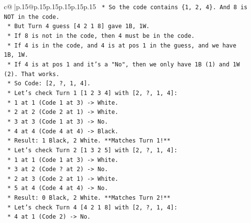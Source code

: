 \documentclass{article}
\begin{document}
{\begin{supertabular}{c@{$\;$}|p{.15\linewidth}@{}p{.15\linewidth}p{.15\linewidth}p{.15\linewidth}p{.15\linewidth}p{.15\linewidth}}
{{{\texttt{                                *   So the code contains \{1, 2, 4\}. And 8 is NOT in the code.} \\
\texttt{                                *   But Turn 4 guess {[}4 2 1 8{]} gave 1B, 1W.} \\
\texttt{                                *   If 8 is not in the code, then 4 must be in the code.} \\
\texttt{                                *   If 4 is in the code, and 4 is at pos 1 in the guess, and we have 1B, 1W.} \\
\texttt{                                *   If 4 is at pos 1 and it's a "No", then we only have 1B (1) and 1W (2). That works.} \\
\texttt{                                *   So Code: {[}2, ?, 1, 4{]}.} \\
\texttt{                                *   Let's check Turn 1 {[}1 2 3 4{]} with {[}2, ?, 1, 4{]}:} \\
\texttt{                                    *   1 at 1 (Code 1 at 3) {-}> White.} \\
\texttt{                                    *   2 at 2 (Code 2 at 1) {-}> White.} \\
\texttt{                                    *   3 at 3 (Code 1 at 3) {-}> No.} \\
\texttt{                                    *   4 at 4 (Code 4 at 4) {-}> Black.} \\
\texttt{                                    *   Result: 1 Black, 2 White. **Matches Turn 1!**} \\
\texttt{                                *   Let's check Turn 2 {[}1 3 2 5{]} with {[}2, ?, 1, 4{]}:} \\
\texttt{                                    *   1 at 1 (Code 1 at 3) {-}> White.} \\
\texttt{                                    *   3 at 2 (Code ? at 2) {-}> No.} \\
\texttt{                                    *   2 at 3 (Code 2 at 1) {-}> White.} \\
\texttt{                                    *   5 at 4 (Code 4 at 4) {-}> No.} \\
\texttt{                                    *   Result: 0 Black, 2 White. **Matches Turn 2!**} \\
\texttt{                                *   Let's check Turn 4 {[}4 2 1 8{]} with {[}2, ?, 1, 4{]}:} \\
\texttt{                                    *   4 at 1 (Code 2) {-}> No.} \\
}}}
\end{supertabular}}
\end{document}

